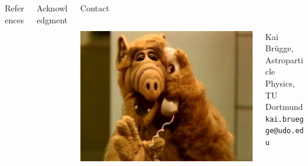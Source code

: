 \vfill
\begin{columns}[t, onlytextwidth]%
  \begin{column}{0.42\textwidth}%
    \begin{block}[equal height group=bottom]{\normalsize References}
      \footnotesize%
      \printbibliography%
    \end{block}
  \end{column}%
  \begin{column}{0.42\textwidth}%
    \begin{block}[equal height group=bottom]{\normalsize Acknowledgment}
      \begin{multicols}{2}%
        \footnotesize
        
      \end{multicols}%
    \end{block}
  \end{column}%
  \begin{column}{0.16\textwidth}%
    \begin{block}[equal height group=bottom]{\normalsize Contact}
      \begin{columns}%
        \begin{column}{0.33\textwidth}
          \includegraphics[width=\linewidth]{images/alf.jpg}
        \end{column}
        \begin{column}{0.65\textwidth}
          \footnotesize
              Kai Brügge, \\
              Astroparticle Physics, \\
              TU Dortmund \\
              \texttt{kai.bruegge@udo.edu}
        \end{column}

      \end{columns}
    \end{block}
  \end{column}%
\end{columns}%

